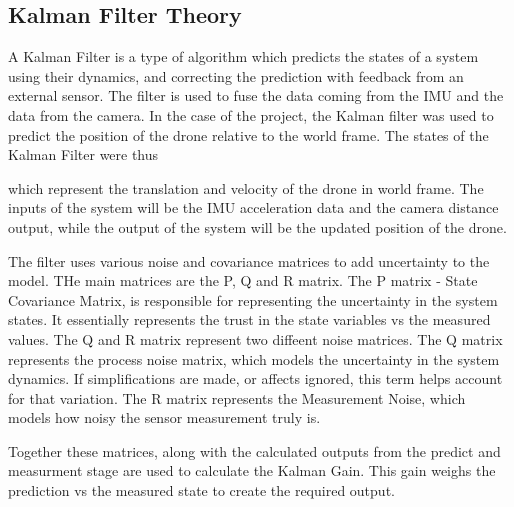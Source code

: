 \documentclass[bare_jrnl_transmag]{subfiles}
\begin{document}
\subsection{Kalman Filter Theory}
A Kalman Filter is a type of algorithm which predicts the states of a system using their dynamics, and correcting the prediction with feedback from an external sensor. The filter is used to fuse the data coming from the IMU and the data from the camera. 
In the case of the project, the Kalman filter was used to predict the position of the drone relative to the world frame. The states of the Kalman Filter were thus 

\begin{equation} 
    [ t_x, t_y, t_z, v_x, v_y, v_z ] 
\end{equation}  which represent the translation and velocity of the drone in world frame. 
The inputs of the system will be the IMU acceleration data and the camera distance output, while the output of the system will be the updated position of the drone.

The filter uses various noise and covariance matrices to add uncertainty to the model. THe main matrices are the P, Q and R matrix. The P matrix - State Covariance Matrix, is responsible for representing the uncertainty in the system states. It essentially represents the trust in the state variables vs the measured values.
The Q and R matrix represent two diffeent noise matrices. The Q matrix represents the process noise matrix, which models the uncertainty in the system dynamics. If simplifications are made, or affects ignored, this term helps account for that variation. The R matrix represents the Measurement Noise, which models how noisy the sensor measurement truly is. 

Together these matrices, along with the calculated outputs from the predict and measurment stage are used to calculate the Kalman Gain. This gain weighs the prediction vs the measured state to create the required output. 
\end{document}

